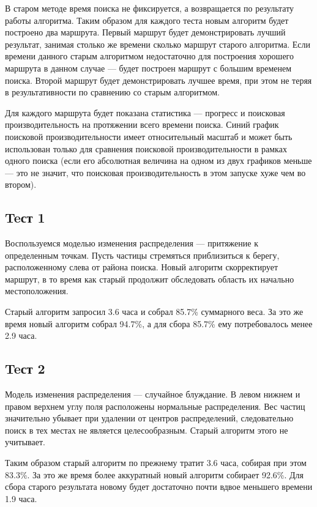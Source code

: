 В старом методе время поиска не фиксируется, а возвращается по результату работы алгоритма.
Таким образом для каждого теста новым алгоритм будет построено два маршрута. Первый маршрут
будет демонстрировать лучший результат, занимая столько же времени сколько маршрут
старого алгоритма. Если времени данного старым алгоритмом недостаточно для построения
хорошего маршрута в данном случае --- будет построен маршрут с большим временем поиска.
Второй маршрут будет демонстрировать лучшее время, при этом не теряя в результативности
по сравнению со старым алгоритмом.

Для каждого маршрута будет показана статистика --- прогресс и поисковая производительность
на протяжении всего времени поиска. Синий график поисковой производительности имеет
относительный масштаб и может быть использован только для сравнения поисковой производительности
в рамках одного поиска (если его абсолютная величина на одном из двух графиков меньше --- это
не значит, что поисковая производительность в этом запуске хуже чем во втором).
\subsection{Teст 1}

Воспользуемся моделью изменения распределения --- притяжение к определенным точкам. Пусть
частицы стремяться приблизиться к берегу, расположенному слева от района поиска. Новый алгоритм
скорректирует маршрут, в то время как старый продолжит обследовать область их начально
местоположения.

 Старый алгоритм запросил 3.6 часа и собрал 85.7\% суммарного веса.
За это же время новый алгоритм собрал 94.7\%, а для сбора 85.7\% ему потребовалось
менее 2.9 часа.

\subsection{Teст 2}
Модель изменения распределения --- случайное блуждание. В левом нижнем и правом верхнем
углу поля расположены нормальные распределения. Вес частиц значительно убывает при удалении
от центров распределений, следовательно поиск в тех местах не является целесообразным.
Старый алгоритм этого не учитывает.

Таким образом старый алгоритм по прежнему тратит 3.6 часа, собирая при этом 83.3\%.
За это же время более аккуратный новый алгоритм собирает 92.6\%. Для сбора старого
результата новому будет достаточно почти вдвое меньшего времени 1.9 часа.


